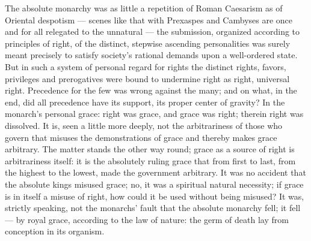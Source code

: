 \documentclass[12pt,a4paper,openany]{book}
\newcommand{\opage}[1]{\marginnote{\footnotesize\textit{[#1]}}}
\begin{document}
The absolute monarchy was as little a repetition
of Roman Caesarism as of Oriental despotism ---
scenes like that with Prexaspes and Cambyses are once
and for all relegated to the unnatural --- the submission, organized
according to principles of right, of the distinct, stepwise
ascending personalities was surely meant precisely to satisfy
society's rational demands upon a well-ordered
state. But in such a system of personal regard for rights
the distinct rights, favors, privileges
and prerogatives were bound to undermine right
as right, universal right. Precedence for the few was wrong
against the many; and on what, in the end, did all precedence have its
support, its proper center of gravity? In the monarch's personal
grace: right was grace, and grace was right; therein
right was dissolved. It is, seen a little more deeply, not the arbitrariness
of those who govern that misuses the demonstrations of grace
\setcounter{footnote}{0}%
\opage{309}and thereby makes grace arbitrary. The matter stands
the other way round; grace as a source of right is arbitrariness itself:
it is the absolutely ruling grace that from first to
last, from the highest to the lowest, made the government arbitrary.
It was no accident that the absolute kings
misused grace; no, it was a spiritual natural necessity;
if grace is in itself a misuse of right,
how could it be used without being misused?
It was, strictly speaking, not the monarchs' fault that
the absolute monarchy fell; it fell --- by royal
grace, according to the law of nature: the germ of death lay from conception
in its organism.
\end{document}
